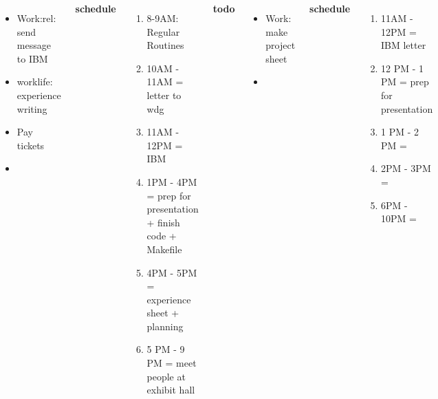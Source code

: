 \begin{frame}
{\begin{columns}
\begin{itemize}
            \tiny \item \tiny Work:rel: send message to IBM 

          \item \tiny worklife: experience writing 

          \item \tiny Pay tickets 
          \item \tiny 

          \end{itemize} 

          \textbf{\small schedule} \\
          \begin{enumerate} 
            \tiny \item \tiny 8-9AM: Regular Routines 

            \tiny \item \tiny 10AM - 11AM =  letter to wdg
          \item \tiny 11AM - 12PM = IBM 
              \tiny \item \tiny 1PM - 4PM = prep for presentation + finish code + Makefile 
              \tiny \item \tiny 4PM - 5PM = experience sheet +
              planning 
              \tiny \item \tiny 5 PM - 9 PM = meet people at exhibit hall 
          \end{enumerate} 
          
          \textbf{\small todo} \\
          \begin{itemize}
            \tiny \item \tiny Work: make project sheet  
          \item \tiny  {} 
          \end{itemize}  
          \textbf{\small schedule} 
          \begin{enumerate}
            \tiny \item \tiny 11AM - 12PM = IBM letter 

          \item \tiny 12 PM - 1 PM = prep for presentation 
          \item \tiny 1 PM - 2 PM = 
            \tiny \item \tiny 2PM - 3PM = 
          \item \tiny 6PM - 10PM = 
          \end{enumerate}  
          

\end{columns}}
\end{frame}

